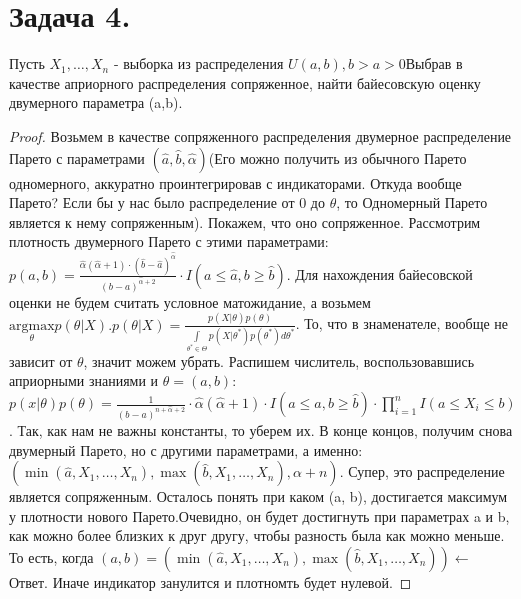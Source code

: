 \documentclass{article}
\newcommand{\argmax}[1]{\underset{#1}{\mathrm{argmax}}}
\theoremstyle{plain}
\theoremstyle{definition}
\begin{document}
\section{Задача 4.}
Пусть $X_1, \dots , X_n$ - выборка из распределения $U(a,b), b > a > 0$Выбрав в качестве априорного распределения сопряженное, найти байесовскую оценку двумерного параметра (a,b).	
\begin{proof}
	Возьмем в качестве сопряженного распределения двумерное распределение Парето с параметрами $(\hat{a}, \hat{b}, \hat{\alpha})$(Его можно получить из обычного Парето одномерного, аккуратно проинтегрировав с индикаторами. Откуда вообще Парето? Если бы у нас было распределение от 0 до $\theta$, то Одномерный Парето является к нему сопряженным). Покажем, что оно сопряженное. Рассмотрим плотность двумерного Парето с этими параметрами:
	 $p(a, b) = \frac{ \hat{\alpha}(\hat{\alpha} + 1) 
	 \cdot (\hat{b} - \hat{a})^{\hat{\alpha}}}{  (b - a)^{\hat{\alpha} + 2} } \cdot I(a \leq \hat{a}, b \geq \hat{b})$. Для нахождения байесовской оценки не будем считать условное матожидание, а возьмем $\argmax{\theta} p(\theta | X). p(\theta | X) = \frac{p(X | \theta)p(\theta)}{\int\limits_{\theta^* \in \Theta} p(X|\theta^*)p(\theta^*)d\theta^*}$. То, что в знаменателе, вообще не зависит от $\theta$, значит можем убрать. Распишем числитель, воспользовавшись априорными знаниями и $\theta = (a,b)$: $p(x|\theta)p(\theta) = \frac{1}{(b - a)^{n + \hat{\alpha} + 2}} \cdot  \hat{\alpha}(\hat{\alpha} + 1) \cdot I(a \leq \hat{a}, b \geq  \hat{b}) \cdot \prod\limits_{i = 1}^{n}I(a \leq X_i \leq b)$. Так, как нам не важны константы, то уберем их. В конце концов, получим снова двумерный Парето, но с другими параметрами, а именно: $(\min{(\hat{a}, X_1, \dots, X_n)}, \max{(\hat{b}, X_1, \dots, X_n)}, \alpha + n)$. Супер, это распределение является сопряженным. Осталось понять при каком (a, b), достигается максимум у плотности нового Парето.Очевидно, он будет достигнуть при параметрах a и b, как можно более близких к друг другу, чтобы разность была как можно меньше.
	 То есть, когда $(a, b) = (\min{(\hat{a}, X_1, \dots, X_n)}, \max{(\hat{b}, X_1, \dots, X_n)}) \leftarrow$ Ответ. Иначе индикатор занулится и плотномть будет нулевой.
\end{proof}
\end{document}
